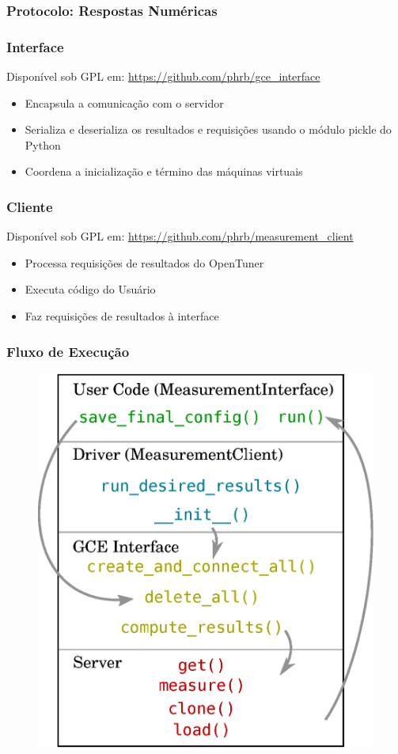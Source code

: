 \documentclass[10pt, compress]{beamer}
\begin{document}
\begin{frame}[fragile]
  \frametitle{Protocolo: Respostas Numéricas}
  
\end{frame}

\begin{frame}[fragile]
    \frametitle{Interface}
    Disponível sob GPL em:
    \url{https://github.com/phrb/gce_interface}
    \begin{itemize}
        \item \alert{Encapsula} a comunicação com o servidor
        \item \alert{Serializa e deserializa} os resultados e requisições
            usando o módulo \alert{pickle} do Python
        \item \alert{Coordena} a inicialização e término das máquinas
            virtuais
    \end{itemize}
\end{frame}

\begin{frame}[fragile]
    \frametitle{Cliente}
    Disponível sob GPL em:
    \url{https://github.com/phrb/measurement_client}
    \begin{itemize}
        \item \alert{Processa} requisições de 
            resultados do OpenTuner
        \item \alert{Executa} código do Usuário
        \item Faz \alert{requisições} de resultados à interface
    \end{itemize}
\end{frame}

\begin{frame}[fragile]
  \frametitle{Fluxo de Execução}
  \begin{figure}[H]
      \centering
      \includegraphics[width=.5\textwidth]{interfaceflow_simple}
  \end{figure}
\end{frame}
\end{document}
